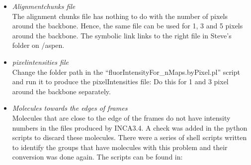 \documentclass[11pt]{article}
\begin{document}
\begin{itemize}
\item \emph{Alignmentchunks file} \\
The alignment chunks file has nothing to do with the number of pixels around the backbone. Hence, the same file can be used for 1, 3 and 5 pixels around the backbone. The symbolic link 
links to the right file in Steve's folder on /aspen.
\item \emph{pixelintensities file} \\
Change the folder path in the ``fluorIntensityFor\_nMaps.byPixel.pl'' script and run it to produce the pixelIntensities file:
Do this for 1 and 3 pixel around the backbone separately. 
\item \emph{Molecules towards the edges of frames} \\
Molecules that are close to the edge of the frames do not have intensity numbers in the files produced by INCA3.4. A check was added in the python scripts to discard these molecules. There were a series of shell scripts written to identify the groups that have molecules with this problem and their conversion was done again. The scripts can be found in:
\end{itemize}




\end{document}
